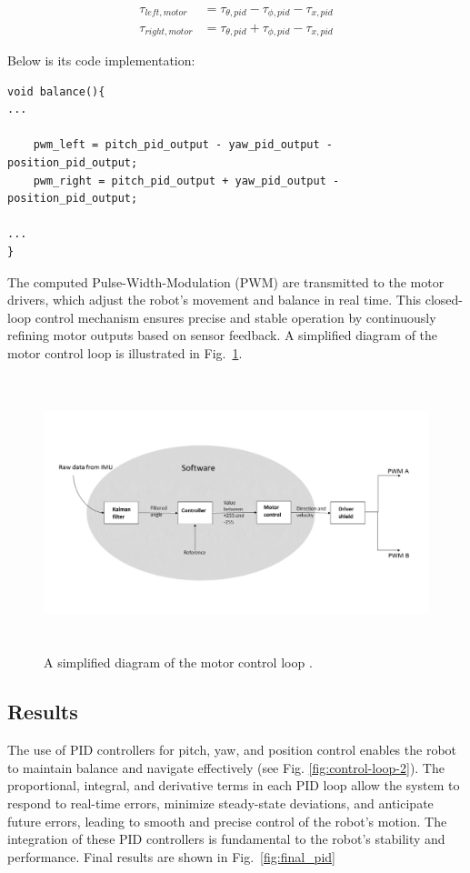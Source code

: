 \begin{align}
	\tau_{left,motor} &= \tau_{\theta,pid} - \tau_{\phi,pid} - \tau_{x,pid} \\
	\tau_{right,motor} &= \tau_{\theta,pid} + \tau_{\phi,pid} - \tau_{x,pid}
\end{align}

Below is its code implementation:
\begin{lstlisting}[style=cppstyle2]
void balance(){
...
			
	pwm_left = pitch_pid_output - yaw_pid_output - position_pid_output;
	pwm_right = pitch_pid_output + yaw_pid_output - position_pid_output;

...
}
\end{lstlisting}

The computed Pulse-Width-Modulation (PWM) are transmitted to the motor drivers, which adjust the robot's movement and balance in real time. This closed-loop control mechanism ensures precise and stable operation by continuously refining motor outputs based on sensor feedback. A simplified diagram of the motor control loop is illustrated in Fig.~\ref{fig:schematics_control-loop}.

\begin{figure}[H]
	\centering
	\includegraphics[height=8cm]{assets/pitch_angle_control_loop.png}
	\caption{A simplified diagram of the motor control loop \cite{10193276}.}
	\label{fig:schematics_control-loop}
\end{figure}


\subsection{Results}
The use of PID controllers for pitch, yaw, and position control enables the robot to maintain balance and navigate effectively (see Fig. \ref{fig:control-loop-2}). The proportional, integral, and derivative terms in each PID loop allow the system to respond to real-time errors, minimize steady-state deviations, and anticipate future errors, leading to smooth and precise control of the robot's motion. The integration of these PID controllers is fundamental to the robot's stability and performance. Final results are shown in Fig.~\ref{fig:final_pid}

